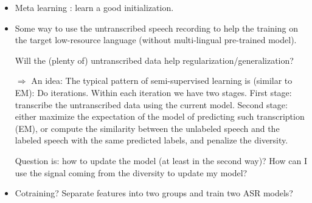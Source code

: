 \documentclass{article}
\begin{document}
\begin{itemize}

\item Meta learning \cite{Gu2018}: learn a good initialization.

\item Some way to use the untranscribed speech recording to help the training on the target low-resource language (without multi-lingual pre-trained model).

Will the (plenty of) untranscribed data help regularization/generalization?

$\Rightarrow$ An idea: The typical pattern of semi-supervised learning is (similar to EM): Do iterations. Within each iteration we have two stages. First stage: transcribe the untranscribed data using the current model. Second stage: either maximize the expectation of the model of predicting such transcription (EM), or compute the similarity between the unlabeled speech and the labeled speech with the same predicted labels, and penalize the diversity.

Question is: how to update the model (at least in the second way)? How can I use the signal coming from the diversity to update my model?

\item Cotraining? Separate features into two groups and train two ASR models?

\end{itemize}











\end{document}
